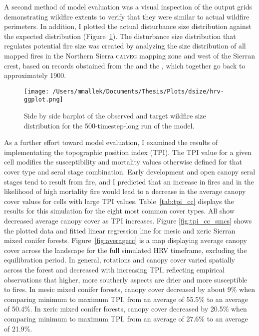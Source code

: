 A second method of model evaluation was a visual inspection of the output grids demonstrating wildfire extents to verify that they were similar to actual wildfire perimeters. In addition, I plotted the actual disturbance size distribution against the expected distribution (Figure~\ref{fig:dsize}). The disturbance size distribution that regulates potential fire size was created by analyzing the size distribution of all mapped fires in the Northern Sierra \textsc{calveg} mapping zone and west of the Sierran crest, based on records obstained from the \citet{usgs-fire-data2012} and the \citet{calfire2012}, which together go back to approximately 1900.   


\begin{figure}[!htbp]
  \centering
    \centering
    \texttt{[image: /Users/mmallek/Documents/Thesis/Plots/dsize/hrv-ggplot.png]}
  \caption{Side by side barplot of the observed and target wildfire size distribution for the 500-timestep-long run of the model.}
  \label{fig:dsize}
\end{figure}

As a further effort toward model evaluation, I examined the results of implementating the topographic position index (TPI). The TPI value for a given cell modifies the susceptibility and mortality values otherwise defined for that cover type and seral stage combination. Early development and open canopy seral stages tend to result from fire, and I predicted that an increase in fires and in the likelihood of high mortality fire would lead to a decrease in the average canopy cover values for cells with large TPI values. Table~\ref{tab:tpi_cc} displays the results for this simulation for the eight most common cover types. All show decreased average canopy cover as TPI increases. Figure \ref{fig:tpi_cc_smcs} shows the plotted data and fitted linear regression line for mesic and xeric Sierran mixed conifer forests. Figure~\ref{fig:averagecc} is a map displaying average canopy cover across the landscape for the full simulated HRV timeframe, excluding the equilibration period. In general, rotations and canopy cover varied spatially across the forest and decreased with increasing TPI, reflecting empirical observations that higher, more southerly aspects are drier and more susceptible to fires. In mesic mixed conifer forests, canopy cover decreased by about 9\% when comparing minimum to maximum TPI, from an average of 55.5\% to an average of 50.4\%. In xeric mixed conifer forests, canopy cover decreased by 20.5\% when comparing minimum to maximum TPI, from an average of 27.6\% to an average of 21.9\%.


